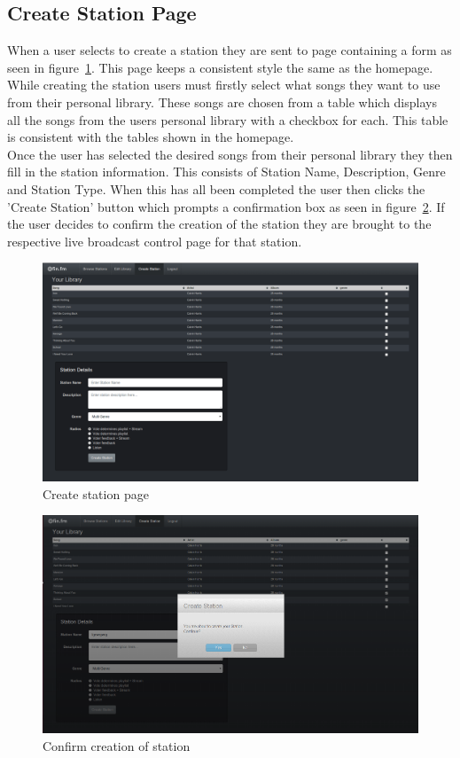 \documentclass[a4paper, 12pt]{report}
\begin{document}
\subsection{Create Station Page}
When a user selects to create a station they are sent to page containing a form as seen in figure~\ref{create station}. This page keeps a consistent style the same as the homepage. While creating the station users must firstly select what songs they want to use from their personal library. These songs are chosen from a table which displays all the songs from the users personal library with a checkbox for each. This table is consistent with the tables shown in the homepage.\\
Once the user has selected the desired songs from their personal library they then fill in the station information. This consists of Station Name, Description, Genre and Station Type. When this has all been completed the user then clicks the 'Create Station' button which prompts a confirmation box as seen in figure~\ref{create-confirm}. If the user decides to confirm the creation of the station they are brought to the respective live broadcast control page for that station.
\begin{figure}[H]
  \centering
    \includegraphics[width=1.0\textwidth]{screenshots/create-station.png}
    \caption{Create station page}
    \label{create station}
\end{figure}
\begin{figure}[H]
  \centering
    \includegraphics[width=1.0\textwidth]{screenshots/create-station-confirm.png}
    \caption{Confirm creation of station}
    \label{create-confirm}
\end{figure}
\end{document}
